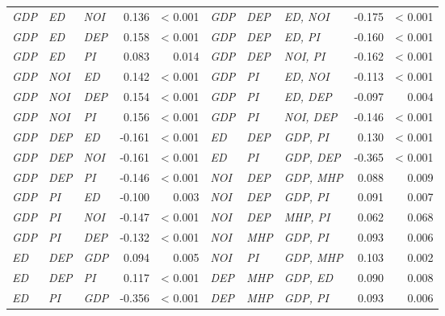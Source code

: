 \begin{tabular}{lllrr|lllrr}
\textit{GDP} & \textit{ED} & \textit{NOI} & 0.136 & \textless{} 0.001 & \textit{GDP} & \textit{DEP} & \textit{ED, NOI} & -0.175 & \textless{} 0.001 \\
\textit{GDP} & \textit{ED} & \textit{DEP} & 0.158 & \textless{} 0.001 & \textit{GDP} & \textit{DEP} & \textit{ED, PI} & -0.160 & \textless{} 0.001 \\
\textit{GDP} & \textit{ED} & \textit{PI} & 0.083 & 0.014 & \textit{GDP} & \textit{DEP} & \textit{NOI, PI} & -0.162 & \textless{} 0.001 \\
\textit{GDP} & \textit{NOI} & \textit{ED} & 0.142 & \textless{} 0.001 & \textit{GDP} & \textit{PI} & \textit{ED, NOI} & -0.113 & \textless{} 0.001 \\
\textit{GDP} & \textit{NOI} & \textit{DEP} & 0.154 & \textless{} 0.001 & \textit{GDP} & \textit{PI} & \textit{ED, DEP} & -0.097 & 0.004 \\
\textit{GDP} & \textit{NOI} & \textit{PI} & 0.156 & \textless{} 0.001 & \textit{GDP} & \textit{PI} & \textit{NOI, DEP} & -0.146 & \textless{} 0.001 \\
\textit{GDP} & \textit{DEP} & \textit{ED} & -0.161 & \textless{} 0.001 & \textit{ED} & \textit{DEP} & \textit{GDP, PI} & 0.130 & \textless{} 0.001 \\
\textit{GDP} & \textit{DEP} & \textit{NOI} & -0.161 & \textless{} 0.001 & \textit{ED} & \textit{PI} & \textit{GDP, DEP} & -0.365 & \textless{} 0.001 \\
\textit{GDP} & \textit{DEP} & \textit{PI} & -0.146 & \textless{} 0.001 & \textit{NOI} & \textit{DEP} & \textit{GDP, MHP} & 0.088 & 0.009 \\
\textit{GDP} & \textit{PI} & \textit{ED} & -0.100 & 0.003 & \textit{NOI} & \textit{DEP} & \textit{GDP, PI} & 0.091 & 0.007 \\
\textit{GDP} & \textit{PI} & \textit{NOI} & -0.147 & \textless{} 0.001 & \textit{NOI} & \textit{DEP} & \textit{MHP, PI} & 0.062 & 0.068 \\
\textit{GDP} & \textit{PI} & \textit{DEP} & -0.132 & \textless{} 0.001 & \textit{NOI} & \textit{MHP} & \textit{GDP, PI} & 0.093 & 0.006 \\
\textit{ED} & \textit{DEP} & \textit{GDP} & 0.094 & 0.005 & \textit{NOI} & \textit{PI} & \textit{GDP, MHP} & 0.103 & 0.002 \\
\textit{ED} & \textit{DEP} & \textit{PI} & 0.117 & \textless{} 0.001 & \textit{DEP} & \textit{MHP} & \textit{GDP, ED} & 0.090 & 0.008 \\
\textit{ED} & \textit{PI} & \textit{GDP} & -0.356 & \textless{} 0.001 & \textit{DEP} & \textit{MHP} & \textit{GDP, PI} & 0.093 & 0.006 \\

\end{tabular}
